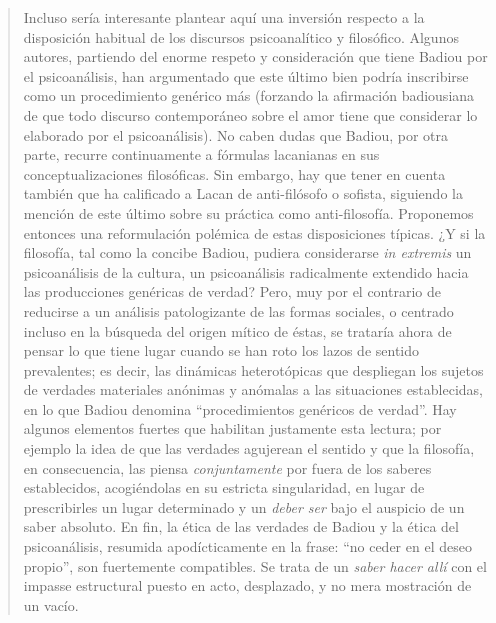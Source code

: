 \begin{quote}
Incluso sería interesante plantear aquí una inversión respecto a la disposición habitual de los discursos psicoanalítico y filosófico. Algunos autores, partiendo del enorme respeto y consideración que tiene Badiou por el psicoanálisis, han argumentado que este último bien podría inscribirse como un procedimiento genérico más (forzando la afirmación badiousiana de que todo discurso contemporáneo sobre el amor tiene que considerar lo elaborado por el psicoanálisis). No caben dudas que Badiou, por otra parte, recurre continuamente a fórmulas lacanianas en sus conceptualizaciones filosóficas. Sin embargo, hay que tener en cuenta también que ha calificado a Lacan de anti-filósofo o sofista, siguiendo la mención de este último sobre su práctica como anti-filosofía. Proponemos entonces una reformulación polémica de estas disposiciones típicas. ¿Y si la filosofía, tal como la concibe Badiou, pudiera considerarse \emph{in extremis} un psicoanálisis de la cultura, un psicoanálisis radicalmente extendido hacia las producciones genéricas de verdad? Pero, muy por el contrario de reducirse a un análisis patologizante de las formas sociales, o centrado incluso en la búsqueda del origen mítico de éstas, se trataría ahora de pensar lo que tiene lugar cuando se han roto los lazos de sentido prevalentes; es decir, las dinámicas heterotópicas que despliegan los sujetos de verdades materiales anónimas y anómalas a las situaciones establecidas, en lo que Badiou denomina \enquote{procedimientos genéricos de verdad}. Hay algunos elementos fuertes que habilitan justamente esta lectura; por ejemplo la idea de que las verdades agujerean el sentido y que la filosofía, en consecuencia, las piensa \emph{conjuntamente} por fuera de los saberes establecidos, acogiéndolas en su estricta singularidad, en lugar de prescribirles un lugar determinado y un \emph{deber ser} bajo el auspicio de un saber absoluto. En fin, la ética de las verdades de Badiou y la ética del psicoanálisis, resumida apodícticamente en la frase: \enquote{no ceder en el deseo propio}, son fuertemente compatibles. Se trata de un \emph{saber hacer allí} con el impasse estructural puesto en acto, desplazado, y no mera mostración de un vacío.


\end{quote}
